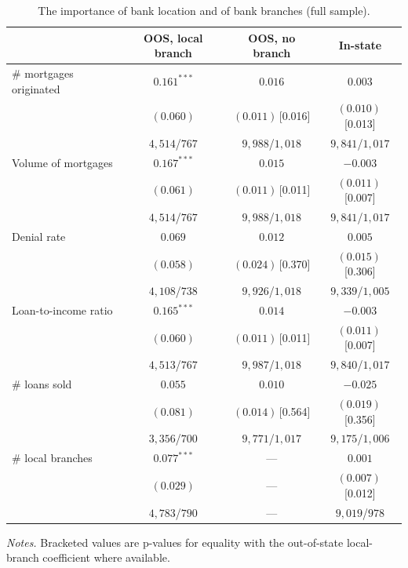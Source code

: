 \begin{table}[htbp]
  \centering
  \caption{The importance of bank location and of bank branches (full sample).}
  \label{tab:banktype-full}
  \small
  \begin{tabular}{lccc}
    \toprule
     & OOS, local branch & OOS, no branch & In-state \\
    \midrule
    \# mortgages originated & $0.161^{***}$ & $0.016$ & $0.003$ \\
                            & $(0.060)$ & $(0.011)$\,[0.016] & $(0.010)$\,[0.013] \\
                            & {\scriptsize $4,514$/$767$} & {\scriptsize $9,988$/$1,018$} & {\scriptsize $9,841$/$1,017$} \\
    \addlinespace
    Volume of mortgages & $0.167^{***}$ & $0.015$ & $-0.003$ \\
                            & $(0.061)$ & $(0.011)$\,[0.011] & $(0.011)$\,[0.007] \\
                            & {\scriptsize $4,514$/$767$} & {\scriptsize $9,988$/$1,018$} & {\scriptsize $9,841$/$1,017$} \\
    \addlinespace
    Denial rate & $0.069$ & $0.012$ & $0.005$ \\
                            & $(0.058)$ & $(0.024)$\,[0.370] & $(0.015)$\,[0.306] \\
                            & {\scriptsize $4,108$/$738$} & {\scriptsize $9,926$/$1,018$} & {\scriptsize $9,339$/$1,005$} \\
    \addlinespace
    Loan-to-income ratio & $0.165^{***}$ & $0.014$ & $-0.003$ \\
                            & $(0.060)$ & $(0.011)$\,[0.011] & $(0.011)$\,[0.007] \\
                            & {\scriptsize $4,513$/$767$} & {\scriptsize $9,987$/$1,018$} & {\scriptsize $9,840$/$1,017$} \\
    \addlinespace
    \# loans sold & $0.055$ & $0.010$ & $-0.025$ \\
                            & $(0.081)$ & $(0.014)$\,[0.564] & $(0.019)$\,[0.356] \\
                            & {\scriptsize $3,356$/$700$} & {\scriptsize $9,771$/$1,017$} & {\scriptsize $9,175$/$1,006$} \\
    \addlinespace
    \# local branches & $0.077^{***}$ & --- & $0.001$ \\
                            & $(0.029)$ & --- & $(0.007)$\,[0.012] \\
                            & {\scriptsize $4,783$/$790$} & --- & {\scriptsize $9,019$/$978$} \\
    \bottomrule
  \end{tabular}
  \begin{tablenotes}\footnotesize
  \item \emph{Notes.} Bracketed values are p-values for equality with the out-of-state local-branch coefficient where available.
  \end{tablenotes}
\end{table}

